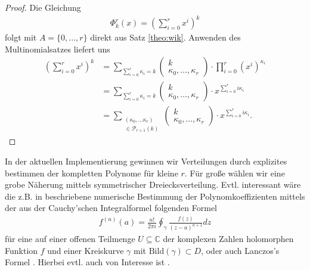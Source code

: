 \documentclass{article}
\begin{document}
\begin{proof}
    Die Gleichung
    \begin{align*}
        \Phi_k^r(x) = \left(\sum_{i=0}^r x^i \right)^k
    \end{align*}
    folgt mit $A=\{0,...,r\}$ direkt aus Satz \ref{theo:wik}.
    Anwenden des Multinomialsatzes liefert uns
    \begin{align*}
        \left(\sum_{i=0}^r x^i\right)^k & = \sum_{\sum_{i=0}^r \kappa_i = k} \begin{pmatrix} k \\ \kappa_0, ..., \kappa_r \end{pmatrix} \cdot \prod_{i=0}^r (x^i)^{\kappa_i} \\
                                        & = \sum_{\sum_{i=0}^r \kappa_i = k} \begin{pmatrix} k \\ \kappa_0, ..., \kappa_r \end{pmatrix} \cdot x^{\sum_{i=0}^r i \kappa_i}    \\
                                        & = \sum_{\substack{(\kappa_0, ... \kappa_r)                                                         \\ \in \mathcal{P}_{r+1}(k)}} \begin{pmatrix} k \\ \kappa_0, ..., \kappa_r \end{pmatrix} \cdot x^{\sum_{i=0}^r i \kappa_i}.
    \end{align*}
\end{proof}

In der aktuellen Implementierung gewinnen wir Verteilungen durch explizites bestimmen der kompletten Polynome für kleine $r$. Für große wählen wir eine grobe Näherung mittels symmetrischer Dreiecksverteilung.
Evtl. interessant wäre die z.B. in \cite{hosono} beschriebene numerische Bestimmung der Polynomkoeffizienten mittels der aus der Cauchy'schen Integralformel folgenden Formel
\begin{align*}
    f^{(n)}(a) = \frac{n!}{2 \pi i} \oint_\gamma \frac{f(z)}{(z-a)^{n+1}} dz
\end{align*}
für eine auf einer offenen Teilmenge $U \subseteq \mathbb{C}$ der komplexen Zahlen holomorphen Funktion $f$ und einer Kreiskurve $\gamma$ mit $\text{Bild}(\gamma) \subset D$, oder auch Lanczos's Formel \cite{lanczos}. Hierbei evtl. auch von Interesse ist \cite{lyness-delves}.

\printbibliography
\end{document}
